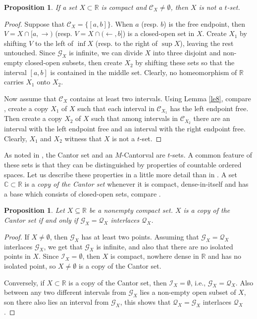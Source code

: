 \documentclass[12pt,a4paper,leqno]{amsart}
\newtheorem{pro}[thm]{Proposition}
\theoremstyle{definition}
\begin{document}
\begin{pro}\label{p11} If a set $X\subset \mathbb R$ is compact and  $\mathcal C_X\not= \emptyset$, then $X$ is not a $ t $-set.
\end{pro}
\begin{proof}  Suppose that $\mathcal C_X=\{[a,b]\} $. When $a$ (resp. $b$) is the free endpoint, then  $V=X\cap [a,\rightarrow)$ (resp. $V=X\cap (\leftarrow, b]$) is a closed-open set in $X$. Create $X_1$ by shifting 
 $V $ to the left of $\inf X$ (resp. to the right of $\sup X$), leaving the rest untouched.    Since $\mathcal G_X$ is infinite, we can divide $X$ into three disjoint and non-empty closed-open subsets, then  create $X_2$ by shifting these sets so that the interval $[a,b]$ is contained in the middle set. Clearly, no homeomorphism of $\mathbb R$ carries $X_1$ onto $X_2$.



Now assume that $\mathcal C_X$ contains at least two intervals. Using Lemma \ref{le8}, compare \cite[Remark 8]{bkp}, create a copy $X_1$ of $X$ such that each interval in $\mathcal C_{X_1}$ has the left endpoint free. Then create a copy $X_2$ of $X$ such that among  intervals in  $\mathcal C_{X_2}$ there are an interval with  the left endpoint free and an interval with the right endpoint free. Clearly, $X_1$ and $X_2$ witness that $X$ is not a $t$-set. 
\end{proof}


 As noted in \cite[pp. 8--9]{bkp},  the Cantor set and  an $M$-Cantorval  are  $ t $-sets. A common feature of these sets is that they can be distinguished by  properties of countable ordered spaces. 
  Let us describe these properties in a little more detail than in \cite{bkp}. 
A set $\mathbb C \subset \mathbb R$ is a \textit{copy of the Cantor set} whenever it is compact, dense-in-itself and has a base which consists of closed-open sets, compare \cite[6.2.A.(c)]{enge}. 
\begin{pro}\label{p12} Let $X\subseteq \mathbb R$ be a nonempty compact set. $X$  is a copy of the Cantor set if and only if  $\mathcal G_X=\mathcal Q_X$ interlaces $\mathcal Q_X$.
\end{pro}
\begin{proof} If $X\not=\emptyset$, then $\mathcal G_X$ has at least two points. Assuming that $\mathcal G_X=\mathcal Q_X$ interlaces $\mathcal G_X$,  we get that $\mathcal G_X$ is infinite, and also that there are no isolated points in $X$. Since $\mathcal I_X=\emptyset$, then $X$ is  compact,  nowhere dense in $\mathbb R$ and has no isolated point, so  $X\not=\emptyset$ is a copy of the Cantor set.  

Conversely, if $X\subset \mathbb R$ is a copy of the Cantor set, then $\mathcal I_X =\emptyset $, i.e., $\mathcal G_X=\mathcal Q_X$. Also between any two different intervals from $\mathcal G_X$ lies a non-empty open subset of $X$, son there also lies an interval from $\mathcal G_X$, this shows that $\mathcal Q_X=\mathcal G_X$ interlaces $\mathcal Q_X$.
\end{proof}
\end{document}
